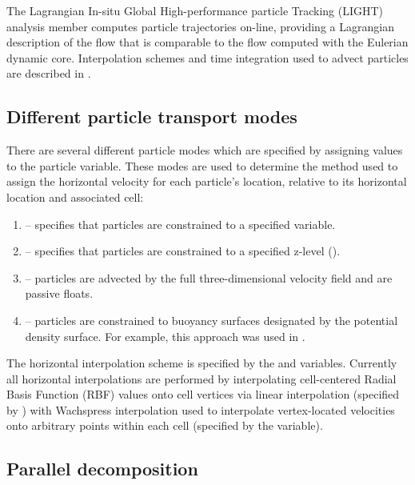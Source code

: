 The Lagrangian In-situ Global High-performance particle Tracking (LIGHT) \citep{Wolfram_di15jpo}
analysis member computes particle trajectories on-line, providing a 
Lagrangian description of the flow that is comparable to the flow computed 
with the Eulerian dynamic core.  Interpolation schemes and time integration used to
advect particles are described in \citet{Wolfram_di15jpo}.  

\subsection{Different particle transport modes}

There are several different particle modes which are specified by assigning values to the  particle
variable.  These modes are used to determine the method used to assign the horizontal velocity for each particle's location,
relative to its horizontal location and associated cell:

\begin{enumerate}
  \item {} -- specifies that particles are constrained to a specified  variable.
  \item {} -- specifies that particles are constrained to a specified z-level ().
  \item {} -- particles are advected by the full three-dimensional velocity field and are passive floats.
  \item {} -- particles are constrained to buoyancy surfaces designated by the  potential density surface.  For example, this approach was used in \citet{Wolfram_di15jpo}.
\end{enumerate}

The horizontal interpolation scheme is specified by the
 and  variables. Currently
all horizontal interpolations are performed by interpolating cell-centered
Radial Basis Function (RBF) values onto cell vertices via linear interpolation
(specified by ) with Wachspress interpolation used to
interpolate vertex-located velocities onto arbitrary points within each cell
(specified by the  variable).  

\subsection{Parallel decomposition}

